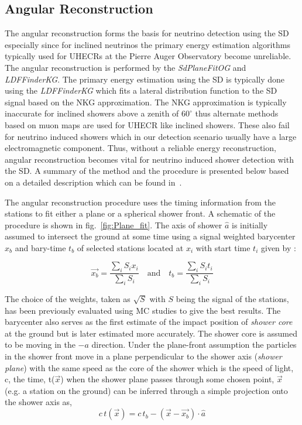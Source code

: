 \subsection{Angular Reconstruction}
\label{subsec:angular_reco}

The angular reconstruction forms the basis for neutrino detection using the SD especially since for inclined neutrinos the primary energy estimation algorithms typically used for UHECRs at the Pierre Auger Observatory become unreliable. The angular reconstruction is performed by the \textit{SdPlaneFitOG} and \textit{LDFFinderKG}. The primary energy estimation using the SD is typically done using the \textit{LDFFinderKG} which fits a lateral distribution function to the SD signal based on the NKG approximation. The NKG approximation is typically inaccurate for inclined showers above a zenith of $60^{\circ}$ thus alternate methods based on muon maps are used for UHECR like inclined showers. These also fail for neutrino induced showers which in our detection scenario usually have a large electromagnetic component. Thus, without a reliable energy reconstruction, angular reconstruction becomes vital for neutrino induced shower detection with the SD. A summary of the method and the procedure is presented below based on a detailed description which can be found in~\cite{PierreAuger:2020yab}. 

The angular reconstruction procedure uses the timing information from the stations to fit either a plane or a spherical shower front. A schematic of the procedure is shown in fig.~\ref{fig:Plane_fit}. The axis of shower $\hat{a}$ is initially assumed to intersect the ground at some time using a signal weighted barycenter $x_b$ and bary-time $t_b$ of selected stations located at $x_i$ with start time $t_i$ given by :

\begin{equation}
  \vec{x_{b}} = \frac{\sum_{i} S_i x_i}{\sum_{i} S_i} \quad \text{and} \quad t_b = \frac{\sum_{i} S_i t_i}{\sum_{i} S_i}
\end{equation}

The choice of the weights, taken as $\sqrt{S} $ with $S$ being the signal of the stations, has been previously evaluated using MC studies to give the best results. The barycenter also serves as the first estimate of the impact position of \textit{shower core} at the ground but is later estimated more accurately. The shower core is assumed to be moving in the $-a$ direction. Under the plane-front assumption the particles in the shower front move in a plane perpendicular to the shower axis (\textit{shower plane}) with the same speed as the core of the shower which is the speed of light, c, the time, t($\vec{x}$) when the shower plane passes through some chosen point, $\vec{x}$ (e.g. a station on the ground) can be inferred through a simple projection onto the shower axis as,
\begin{equation}
  c\,t(\vec{x}) = c\,t_b - (\vec{x}-\vec{x_b})\cdot \hat{a}
\end{equation}


